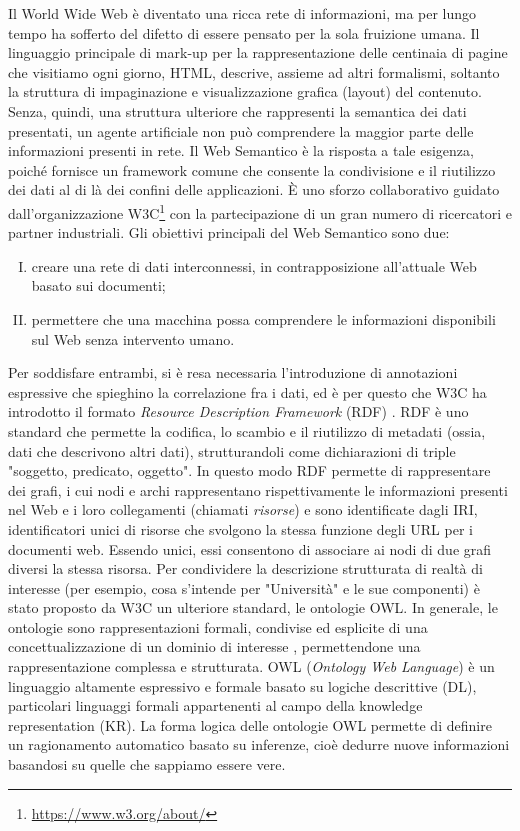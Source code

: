 Il World Wide Web è diventato una ricca rete di informazioni, ma per lungo tempo ha sofferto del difetto di essere pensato per la sola fruizione umana. Il linguaggio principale di mark-up per la rappresentazione delle centinaia di pagine che visitiamo ogni giorno, HTML, descrive, assieme ad altri formalismi, soltanto la struttura di impaginazione e visualizzazione grafica (layout) del contenuto. Senza, quindi, una struttura ulteriore che rappresenti la semantica dei dati presentati, un agente artificiale non può comprendere la maggior parte delle informazioni presenti in rete. Il Web Semantico è la risposta a tale esigenza, poiché fornisce un framework comune che consente la condivisione e il riutilizzo dei dati al di là dei confini delle applicazioni. È uno sforzo collaborativo guidato dall'organizzazione W3C\footnote{\url{https://www.w3.org/about/}} con la partecipazione di un gran numero di ricercatori e partner industriali. Gli obiettivi principali del Web Semantico \cite{berners2001semantic, hitzler2021review} sono due:
\begin{enumerate}[I)]
	\item creare una rete di dati interconnessi, in contrapposizione all'attuale Web basato sui documenti;
	\item permettere che una macchina possa comprendere le informazioni disponibili sul Web senza intervento umano.
\end{enumerate}
Per soddisfare entrambi, si è resa necessaria l'introduzione di annotazioni espressive che spieghino la correlazione fra i dati, ed è per questo che W3C ha introdotto il formato \textit{Resource Description Framework} (RDF) \cite{RDFspecification}. RDF è uno standard che permette la codifica, lo scambio e il riutilizzo di metadati (ossia, dati che descrivono altri dati), strutturandoli come dichiarazioni di triple "soggetto, predicato, oggetto". In questo modo RDF permette di rappresentare dei grafi, i cui nodi e archi rappresentano rispettivamente le informazioni presenti nel Web e i loro collegamenti (chiamati \textit{risorse}) e sono identificate dagli IRI, identificatori unici di risorse che svolgono la stessa funzione degli URL per i documenti web. Essendo unici, essi consentono di associare ai nodi di due grafi diversi la stessa risorsa. Per condividere la descrizione strutturata di realtà di interesse (per esempio, cosa s'intende per "Università" e le sue componenti) è stato proposto da W3C un ulteriore standard, le ontologie OWL. In generale, le ontologie sono rappresentazioni formali, condivise ed esplicite di una concettualizzazione di un dominio di interesse \cite{goy2015ontologies}, permettendone una rappresentazione complessa e strutturata. OWL (\textit{Ontology Web Language}) è un linguaggio altamente espressivo e formale basato su logiche descrittive (DL), particolari linguaggi formali appartenenti  al campo della knowledge representation (KR). La forma logica delle ontologie OWL permette di definire un ragionamento automatico basato su inferenze, cioè dedurre nuove informazioni basandosi su quelle che sappiamo essere vere.

